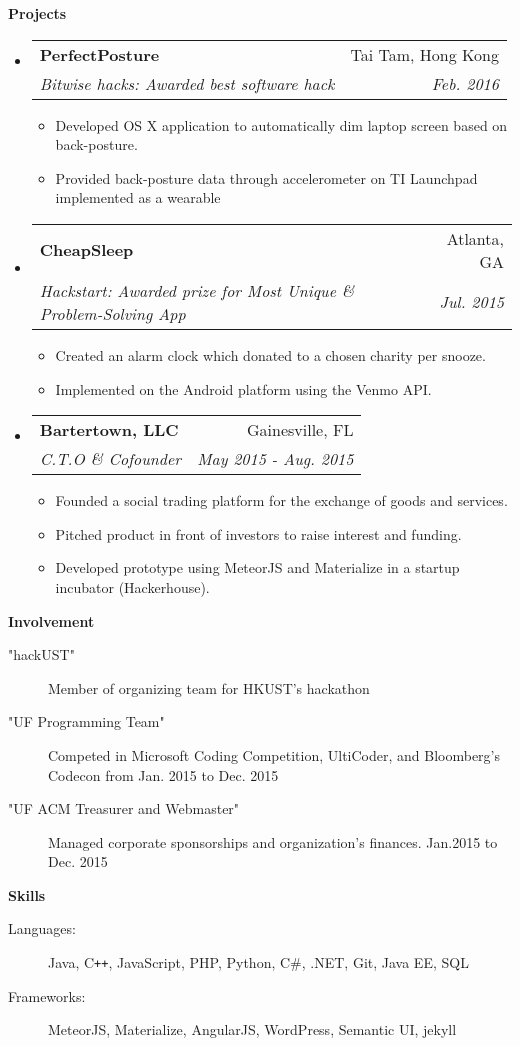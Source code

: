 \documentclass[letterpaper,10pt]{article}
\makeatletter
\newcommand{\resitem}[1]{\item #1 \vspace{-2pt}}
\newcommand{\resheading}[1]{{\large \colorbox{mygrey}{\begin{minipage}{\textwidth}{\textbf{#1 \vphantom{p\^{E}}}}\end{minipage}}}}
\newcommand{\ressubheading}[4]{
\begin{tabular*}{7.0in}{l@{\extracolsep{\fill}}r}
		\textbf{#1} & #2 \\
		\textit{#3} & \textit{#4} \\
\end{tabular*}\vspace{-6pt}}
\makeatother
\begin{document}
\resheading{Projects}
\begin{itemize}
\item
	\ressubheading{PerfectPosture}{Tai Tam, Hong Kong}{Bitwise hacks: Awarded best software hack}{Feb. 2016}
	\begin{itemize}
		\resitem{Developed OS X application to automatically dim laptop screen based on back-posture.}
		\resitem{Provided back-posture data through accelerometer on TI Launchpad implemented as a wearable}
	\end{itemize}
\item
	\ressubheading{CheapSleep}{Atlanta, GA}{Hackstart: Awarded prize for Most Unique \& Problem-Solving App}{Jul. 2015}
	\begin{itemize}
		\resitem{Created an alarm clock which donated to a chosen charity per snooze.}
		\resitem{Implemented on the Android platform using the Venmo API.}
	\end{itemize}
\item
	\ressubheading{Bartertown, LLC}{Gainesville, FL}{C.T.O \& Cofounder}{May 2015 - Aug. 2015}
	\begin{itemize}
		\resitem{Founded a social trading platform for the exchange of goods and services.}
		\resitem{Pitched product in front of investors to raise interest and funding.}
		\resitem{Developed prototype using MeteorJS and Materialize in a startup incubator (Hackerhouse).}
	\end{itemize}

\end{itemize}

\resheading{Involvement}

\begin{description}
\item["hackUST"] Member of organizing team for HKUST's hackathon
\item["UF Programming Team"] Competed in Microsoft Coding Competition, UltiCoder, and Bloomberg's Codecon from Jan. 2015 to Dec. 2015
\item["UF ACM Treasurer and Webmaster"] Managed corporate sponsorships and organization's finances. Jan.2015 to Dec. 2015 
\end{description}

\resheading{Skills}

\begin{description}
\item[Languages:]
Java, C{}\verb!++!, JavaScript, PHP, Python, C\#, .NET, Git, Java EE, SQL
\item[Frameworks:]
MeteorJS, Materialize, AngularJS, WordPress, Semantic UI, jekyll
\end{description}
\end{document}
